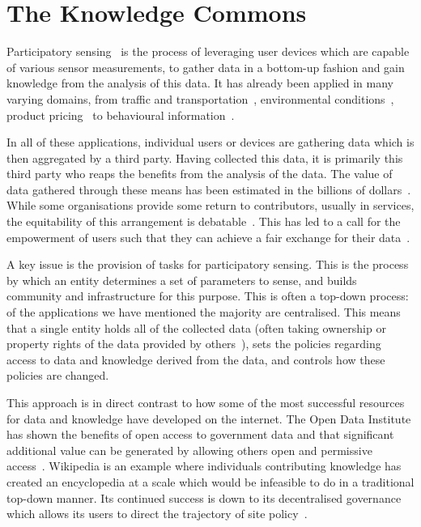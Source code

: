 
\chapter{The Knowledge Commons}\label{ch:kc}

Participatory sensing~\citep{Burke2006} is the process of leveraging user devices which are capable of various sensor measurements, to gather data in a bottom-up fashion and gain knowledge from the analysis of this data. 
It has already been applied in many varying domains, from traffic and transportation~\citep{Costa2012,Mathur2010}, environmental conditions~\citep{Hasenfratz2012,Mendez2011}, product pricing~\citep{Deng2009} to behavioural information~\citep{Miluzzo2008}.

In all of these applications, individual users or devices are gathering data which is then aggregated by a third party. Having collected this data, it is primarily this third party who reaps the benefits from the analysis of the data. The value of data gathered through these means has been estimated in the billions of dollars~\citep{Manyika2011}. While some organisations provide some return to contributors, usually in services, the equitability of this arrangement is debatable~\citep{VanDijck2009}. This has led to a call for the empowerment of users such that they can achieve a fair exchange for their data~\citep{BuckinghamShum2012}.

A key issue is the provision of tasks for participatory sensing. This is the process by which an entity determines a set of parameters to sense, and builds community and infrastructure for this purpose.
This is often a top-down process: of the applications we have mentioned the majority are centralised. This means that a single entity holds all of the collected data (often taking ownership or property rights of the data provided by others~\citep{O'Hara2010}), sets the policies regarding access to data and knowledge derived from the data, and controls how these policies are changed.

This approach is in direct contrast to how some of the most successful resources for data and knowledge have developed on the internet. 
The Open Data Institute has shown the benefits of open access to government data and that significant additional value can be generated by allowing others open and permissive access~\citep{Shadbolt2012}. 
Wikipedia is an example where individuals contributing knowledge has created an encyclopedia at a scale which would be infeasible to do in a traditional top-down manner. 
Its continued success is down to its decentralised governance which allows its users to direct the trajectory of site policy~\citep{Famiglietti2011}.

